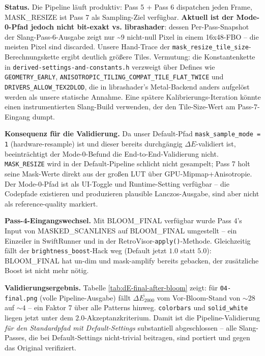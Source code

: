 \documentclass[11pt, a4paper]{article}
\begin{document}
\vspace{.5cm}
\textbf{Status.} Die Pipeline l\"auft produktiv: Pass 5 + Pass 6 dispatchen jeden Frame, MASK\_RESIZE ist Pass 7 als Sampling-Ziel verf\"ugbar. \textbf{Aktuell ist der Mode-0-Pfad jedoch nicht bit-exakt vs. librashader}: dessen Per-Pass-Snapshot der Slang-Pass-6-Ausgabe zeigt nur \textasciitilde 9 nicht-null Pixel in einem 16x48-FBO -- die meisten Pixel sind discarded. Unsere Hand-Trace der \texttt{mask\_resize\_tile\_size}-Berechnungskette ergibt deutlich gr\"o{\ss}ere Tiles. Vermutung: die Konstantenkette in \texttt{derived-settings-and-constants.h} verzweigt \"uber Defines wie \texttt{GEOMETRY\_EARLY}, \texttt{ANISOTROPIC\_TILING\_COMPAT\_TILE\_FLAT\_TWICE} und \texttt{DRIVERS\_ALLOW\_TEX2DLOD}, die in librashader's Metal-Backend anders aufgel\"ost werden als unsere statische Annahme. Eine sp\"atere Kalibrierungs-Iteration k\"onnte einen instrumentierten Slang-Build verwenden, der den Tile-Size-Wert am Pass-7-Eingang dumpt.

\vspace{.5cm}
\textbf{Konsequenz f\"ur die Validierung.} Da unser Default-Pfad \texttt{mask\_sample\_mode = 1} (hardware-resample) ist und dieser bereits durchg\"angig $\Delta E$-validiert ist, beeintr\"achtigt der Mode-0-Befund die End-to-End-Validierung nicht. \texttt{MASK\_RESIZE} wird in der Default-Pipeline schlicht nicht gesampelt; Pass 7 holt seine Mask-Werte direkt aus der gro{\ss}en LUT \"uber GPU-Mipmap+Anisotropie. Der Mode-0-Pfad ist als UI-Toggle und Runtime-Setting verf\"ugbar -- die Codepfade existieren und produzieren plausible Lanczos-Ausgabe, sind aber nicht als reference-quality markiert.

\vspace{.5cm}
\textbf{Pass-4-Eingangswechsel.} Mit BLOOM\_FINAL verf\"ugbar wurde Pass 4's Input von MASKED\_SCANLINES auf BLOOM\_FINAL umgestellt -- ein Einzeiler in SwiftRunner und in der RetroVisor-\texttt{apply()}-Methode. Gleichzeitig f\"allt der \texttt{brightness\_boost}-Hack weg (Default jetzt $1.0$ statt $5.0$): BLOOM\_FINAL hat un-dim und mask-amplify bereits gebacken, der zus\"atzliche Boost ist nicht mehr n\"otig.

\vspace{.5cm}
\textbf{Validierungsergebnis.} Tabelle \ref{tab:dE-final-after-bloom} zeigt: f\"ur \texttt{04-final.png} (volle Pipeline-Ausgabe) f\"allt $\overline{\Delta E_{2000}}$ vom Vor-Bloom-Stand von $\sim 28$ auf $\sim 4$ -- ein Faktor 7 \"uber alle Patterns hinweg. \texttt{colorbars} und \texttt{solid\_white} liegen jetzt unter dem $2.0$-Akzeptanzkriterium. Damit ist die Pipeline-Validierung \emph{f\"ur den Standardpfad mit Default-Settings} substantiell abgeschlossen -- alle Slang-Passes, die bei Default-Settings nicht-trivial beitragen, sind portiert und gegen das Original verifiziert.
\end{document}
